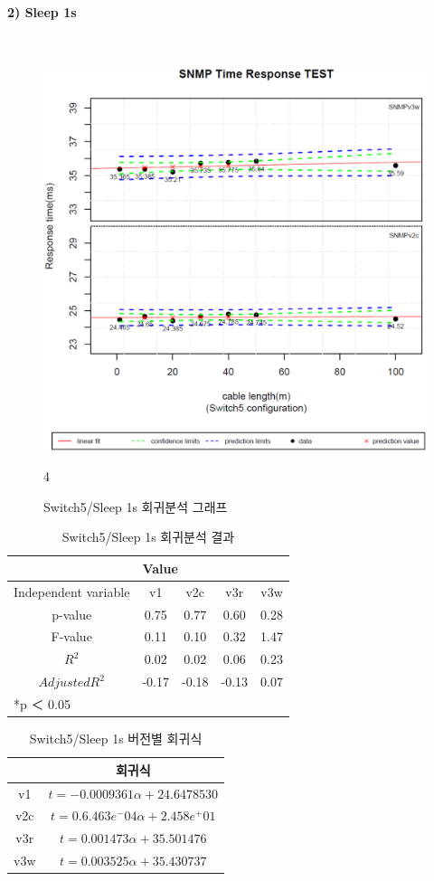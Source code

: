 \documentclass[11pt
  , a4paper
  , article
  , oneside
]{memoir}
\begin{document}
\clearpage
\paragraph{2) Sleep 1s}
   　
\begin{figure}[h!]
  \centering
  \includegraphics[width=0.5 \textwidth]{./images/s5s1.eps}
  \caption{Switch5/Sleep 1s 회귀분석 그래프}
4\end{figure}


\begin{table}[!htb]
\begin{center}
\begin{tabular}{c|c|c|c|c}\hline
& \multicolumn{4}{l}{Value} \\ \hline
Independent variable & v1 & v2c & v3r & v3w \\ \hline\hline
p-value& 0.75 & 0.77 & 0.60 & 0.28 \\ \hline
F-value& 0.11 & 0.10 & 0.32 & 1.47 \\ \hline
$  R^2  $ & 0.02 & 0.02 & 0.06 & 0.23 \\\hline
$ Adjusted R^2 $ &-0.17 & -0.18 & -0.13 & 0.07 \\\hline 
\multicolumn{5}{l}{*p ＜ 0.05} \\ \hline
\end{tabular}
\caption{Switch5/Sleep 1s 회귀분석 결과}
\end{center}
\end{table} 


\begin{table}[!htb]
\begin{center}
\begin{tabular}{c|c}\hline
 & 회귀식  \\ \hline\hline
v1 &  $ t=-0.0009361\alpha + 24.6478530$  \\ 
v2c & $ t=0.6.463e^-04\alpha + 2.458e^+01$ \\ 
v3r & $ t=0.001473\alpha + 35.501476 $ \\ 
v3w & $ t=0.003525\alpha + 35.430737 $  \\ \hline
\end{tabular}
\caption{Switch5/Sleep 1s 버전별 회귀식}
\end{center}
\end{table} 
\end{document}
